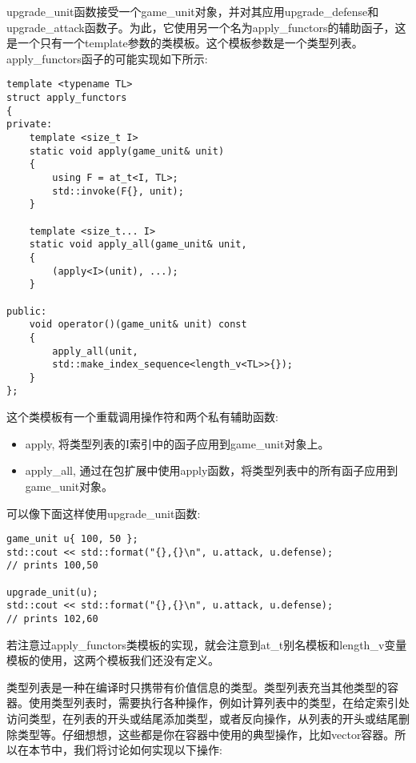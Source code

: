 upgrade\_unit函数接受一个game\_unit对象，并对其应用upgrade\_defense和upgrade\_attack函数子。为此，它使用另一个名为apply\_functors的辅助函子，这是一个只有一个template参数的类模板。这个模板参数是一个类型列表。apply\_functors函子的可能实现如下所示:

\begin{lstlisting}[style=styleCXX]
template <typename TL>
struct apply_functors
{
private:
	template <size_t I>
	static void apply(game_unit& unit)
	{
		using F = at_t<I, TL>;
		std::invoke(F{}, unit);
	}

	template <size_t... I>
	static void apply_all(game_unit& unit,
	{
		(apply<I>(unit), ...);
	}

public:
	void operator()(game_unit& unit) const
	{
		apply_all(unit,
		std::make_index_sequence<length_v<TL>>{});
	}
};
\end{lstlisting}

这个类模板有一个重载调用操作符和两个私有辅助函数:

\begin{itemize}
\item
apply, 将类型列表的I索引中的函子应用到game\_unit对象上。

\item
apply\_all, 通过在包扩展中使用apply函数，将类型列表中的所有函子应用到game\_unit对象。
\end{itemize}

可以像下面这样使用upgrade\_unit函数:

\begin{lstlisting}[style=styleCXX]
game_unit u{ 100, 50 };
std::cout << std::format("{},{}\n", u.attack, u.defense);
// prints 100,50

upgrade_unit(u);
std::cout << std::format("{},{}\n", u.attack, u.defense);
// prints 102,60
\end{lstlisting}

若注意过apply\_functors类模板的实现，就会注意到at\_t别名模板和length\_v变量模板的使用，这两个模板我们还没有定义。


类型列表是一种在编译时只携带有价值信息的类型。类型列表充当其他类型的容器。使用类型列表时，需要执行各种操作，例如计算列表中的类型，在给定索引处访问类型，在列表的开头或结尾添加类型，或者反向操作，从列表的开头或结尾删除类型等。仔细想想，这些都是你在容器中使用的典型操作，比如vector容器。所以在本节中，我们将讨论如何实现以下操作:

